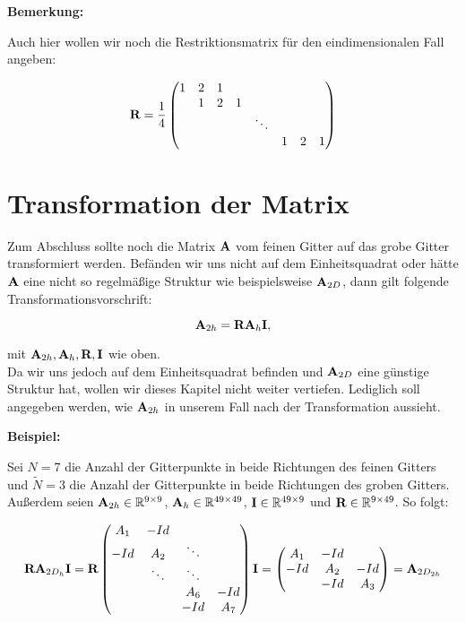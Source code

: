 \textbf{Bemerkung:}

Auch hier wollen wir noch die Restriktionsmatrix für den eindimensionalen Fall angeben:

\begin{equation}
{\textbf{R}} = \frac {1} {4}
\begin{pmatrix}
1 & 2 & 1\\
  & 1 & 2 & 1\\
  &   &   &   & \ddots\\
  &   &   &   &        & 1 & 2 & 1
\end{pmatrix}
\end{equation}

\section{Transformation der Matrix}

Zum Abschluss sollte noch die Matrix ${\textbf{A}}$ vom feinen Gitter auf das grobe Gitter transformiert werden. Befänden wir uns nicht auf dem Einheitsquadrat oder hätte ${\textbf{A}}$ eine nicht so regelmäßige Struktur wie beispielsweise ${\textbf{A}}_{2D}$, dann gilt folgende Transformationsvorschrift:

\begin{equation}
{\textbf{A}}_{2h} = {\textbf{R}}{\textbf{A}}_{h}{\textbf{I}},
\end{equation}

mit ${\textbf{A}}_{2h},{\textbf{A}}_{h},{\textbf{R}},{\textbf{I}}$ wie oben.\\
Da wir uns jedoch auf dem Einheitsquadrat befinden und ${\textbf{A}}_{2D}$ eine günstige Struktur hat, wollen wir dieses Kapitel nicht weiter vertiefen. Lediglich soll angegeben werden, wie ${\textbf{A}}_{2h}$ in unserem Fall nach der Transformation aussieht.

\textbf{Beispiel:}

Sei $N = 7$ die Anzahl der Gitterpunkte in beide Richtungen des feinen Gitters und $\tilde N = 3$ die Anzahl der Gitterpunkte in beide Richtungen des groben Gitters. Außerdem seien ${\textbf{A}}_{2h} \in \mathbb{R}^{9 \times 9}$, ${\textbf{A}}_{h} \in \mathbb{R}^{49 \times 49}$, ${\textbf{I}} \in \mathbb{R}^{49 \times 9}$ und ${\textbf{R}} \in \mathbb{R}^{9 \times 49}$. So folgt:

\begin{equation}
{\textbf{R}}{\textbf{A}}_{2D_{h}}{\textbf{I}} = {\textbf{R}}
\begin{pmatrix}
A_{1} & -Id \\
-Id & A_{2} & \ddots \\
 & \ddots & \ddots \\
 & & A_{6} & -Id\\
 & & -Id & A_{7}
\end{pmatrix}
{\textbf{I}} = 
\begin{pmatrix}
A_{1} & -Id \\
-Id & A_{2} & -Id \\
 & -Id & A_{3}
\end{pmatrix}
= {\textbf{A}}_{2D_{2h}}
\end{equation}

